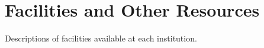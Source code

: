 \chapter{Facilities and Other Resources}
\label{sec:facilities}

%
%






\vspace{0.5in}
\noindent Descriptions of facilities available at 
each institution.

\etocsettocstyle{}{}
\etocchecksemptiness
{}



